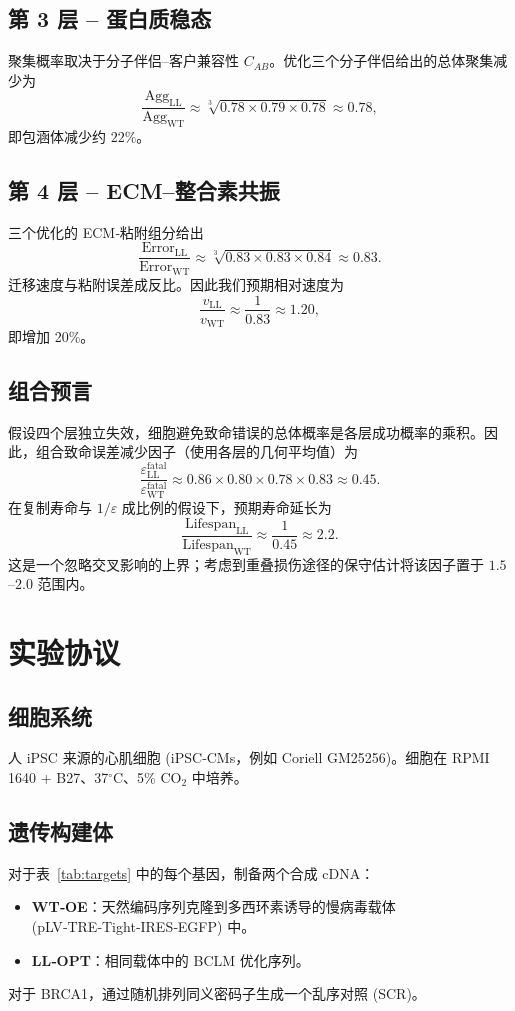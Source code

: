 \documentclass[12pt,a4paper]{article}
\begin{document}
	\subsection{第 3 层 – 蛋白质稳态}
	聚集概率取决于分子伴侣–客户兼容性 \(C_{AB}\)。优化三个分子伴侣给出的总体聚集减少为
	\[
	\frac{\mathrm{Agg}_{\mathrm{LL}}}{\mathrm{Agg}_{\mathrm{WT}}} \approx \sqrt[3]{0.78 \times 0.79 \times 0.78} \approx 0.78,
	\]
	即包涵体减少约 \(22\%\)。
	
	\subsection{第 4 层 – ECM–整合素共振}
	三个优化的 ECM‑粘附组分给出
	\[
	\frac{\mathrm{Error}_{\mathrm{LL}}}{\mathrm{Error}_{\mathrm{WT}}} \approx \sqrt[3]{0.83 \times 0.83 \times 0.84} \approx 0.83.
	\]
	迁移速度与粘附误差成反比。因此我们预期相对速度为
	\[
	\frac{v_{\mathrm{LL}}}{v_{\mathrm{WT}}} \approx \frac{1}{0.83} \approx 1.20,
	\]
	即增加 20\%。
	
	\subsection{组合预言}
	假设四个层独立失效，细胞避免致命错误的总体概率是各层成功概率的乘积。因此，组合致命误差减少因子（使用各层的几何平均值）为
	\[
	\frac{\varepsilon_{\mathrm{LL}}^{\mathrm{fatal}}}{\varepsilon_{\mathrm{WT}}^{\mathrm{fatal}}} \approx 0.86 \times 0.80 \times 0.78 \times 0.83 \approx 0.45.
	\]
	在复制寿命与 \(1/\varepsilon\) 成比例的假设下，预期寿命延长为
	\[
	\frac{\mathrm{Lifespan}_{\mathrm{LL}}}{\mathrm{Lifespan}_{\mathrm{WT}}} \approx \frac{1}{0.45} \approx 2.2.
	\]
	这是一个忽略交叉影响的上界；考虑到重叠损伤途径的保守估计将该因子置于 \(1.5\)–\(2.0\) 范围内。
	
	\section{实验协议}
	\label{sec:protocol}
	
	\subsection{细胞系统}
	人 iPSC 来源的心肌细胞 (iPSC‑CMs，例如 Coriell GM25256)。细胞在 RPMI 1640 + B27、37\(^\circ\)C、5\% CO\(_2\) 中培养。
	
	\subsection{遗传构建体}
	对于表~\ref{tab:targets} 中的每个基因，制备两个合成 cDNA：
	\begin{itemize}
		\item \textbf{WT‑OE}：天然编码序列克隆到多西环素诱导的慢病毒载体 (pLV‑TRE‑Tight‑IRES‑EGFP) 中。
		\item \textbf{LL‑OPT}：相同载体中的 BCLM 优化序列。
	\end{itemize}
	对于 BRCA1，通过随机排列同义密码子生成一个乱序对照 (SCR)。
	
\end{document}
